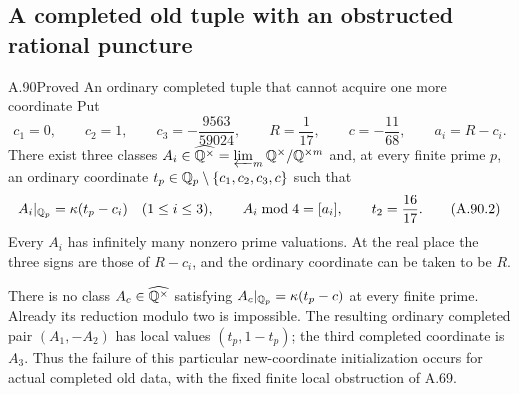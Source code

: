 \subsection{A completed old tuple with an obstructed rational puncture}

\begin{statement}{A.90}{Proved}
{An ordinary completed tuple that cannot acquire one more coordinate}
Put
\[
 c_1=0,\qquad c_2=1,\qquad c_3=-\frac{9563}{59024},
 \qquad R=\frac1{17},\qquad c=-\frac{11}{68},
 \qquad a_i=R-c_i .
 \tag{A.90.1}
\]
There exist three classes
$A_i\in\widehat{\mathbb Q^\times}=\varprojlim_m\mathbb Q^\times/\mathbb Q^{\times m}$
and, at every finite prime $p$, an ordinary coordinate
$t_p\in\mathbb Q_p\setminus\{c_1,c_2,c_3,c\}$ such that
\[
 A_i|_{\mathbb Q_p}=\kappa(t_p-c_i)\quad(1\le i\le3),\qquad
 A_i\bmod4=[a_i],\qquad t_2=\frac{16}{17}.
 \tag{A.90.2}
\]
Every $A_i$ has infinitely many nonzero prime valuations.
At the real place the three signs are those of $R-c_i$,
and the ordinary coordinate can be taken to be $R$.

There is no class $A_c\in\widehat{\mathbb Q^\times}$ satisfying
$A_c|_{\mathbb Q_p}=\kappa(t_p-c)$ at every finite prime.
Already its reduction modulo two is impossible.
The resulting ordinary completed pair
$(A_1,-A_2)$ has local values $(t_p,1-t_p)$;
the third completed coordinate is $A_3$.
Thus the failure of this particular new-coordinate
initialization occurs for actual completed old data,
with the fixed finite local obstruction of A.69.
\end{statement}
